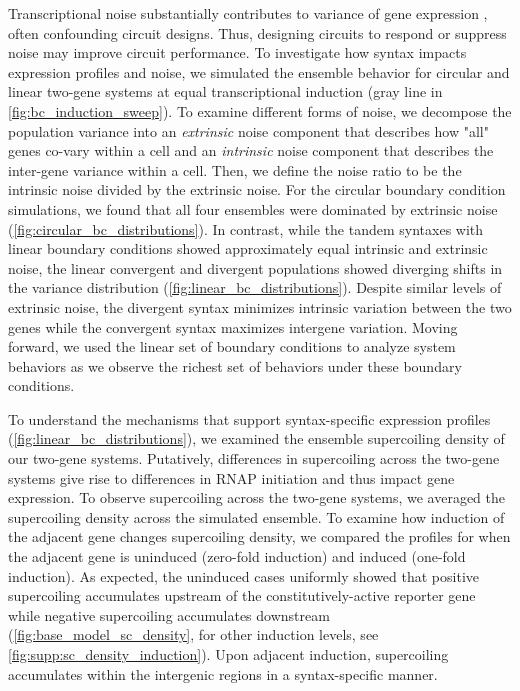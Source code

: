 \documentclass[11pt]{article}
\begin{document}
Transcriptional noise substantially contributes to variance of gene expression \parencite{quartonUncouplingGeneExpression2020}, often confounding circuit designs. Thus, designing circuits to respond or suppress noise may improve circuit performance. To investigate how syntax impacts expression profiles and noise, we simulated the ensemble behavior for circular and linear two-gene systems at equal transcriptional induction (gray line in \cref{fig:bc_induction_sweep}). To examine different forms of noise, we decompose the population variance into an \emph{extrinsic} noise component that describes how "all" genes co-vary within a cell and an \emph{intrinsic} noise component that describes the inter-gene variance within a cell. Then, we define the noise ratio to be the intrinsic noise divided by the extrinsic noise. For the circular boundary condition simulations, we found that all four ensembles were dominated by extrinsic noise (\cref{fig:circular_bc_distributions}). In contrast, while the tandem syntaxes with linear boundary conditions showed approximately equal intrinsic and extrinsic noise, the linear convergent and divergent populations showed diverging shifts in the variance distribution (\cref{fig:linear_bc_distributions}). Despite similar levels of extrinsic noise, the divergent syntax minimizes intrinsic variation between the two genes while the convergent syntax maximizes intergene variation. 
Moving forward, we used the linear set of boundary conditions to analyze system behaviors as we observe the richest set of behaviors under these boundary conditions.

To understand the mechanisms that support syntax-specific expression profiles (\cref{fig:linear_bc_distributions}), we examined the ensemble supercoiling density of our two-gene systems. Putatively, differences in supercoiling across the two-gene systems give rise to differences in RNAP initiation and thus impact gene expression. To observe supercoiling across the two-gene systems, we averaged the supercoiling density across the simulated ensemble. To examine how induction of the adjacent gene changes supercoiling density, we compared the profiles for when the adjacent gene is uninduced (zero-fold induction) and induced (one-fold induction). As expected, the uninduced cases uniformly showed that positive supercoiling accumulates upstream of the constitutively-active reporter gene while negative supercoiling accumulates downstream (\cref{fig:base_model_sc_density}, for other induction levels, see \cref{fig:supp:sc_density_induction}). Upon adjacent induction, supercoiling accumulates within the intergenic regions in a syntax-specific manner.
\end{document}
